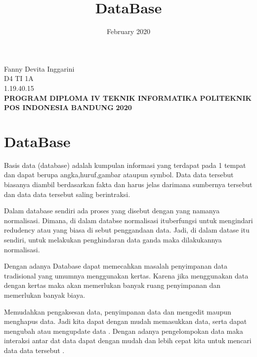 \documentclass{article}
\date{February 2020}
\begin{document}
\title{\huge\textbf{DataBase}}
\date{}

\maketitle
\begin{center}
\vspace{4cm}
Fanny Devita Inggarini\\
D4 TI 1A\\
1.19.40.15\\
\vspace{4cm}
\textbf{PROGRAM DIPLOMA IV TEKNIK INFORMATIKA} \linebreak
\textbf{POLITEKNIK POS INDONESIA} \linebreak
\textbf{BANDUNG}\linebreak
\textbf{2020}\\

\end{center}
\newpage

\section{DataBase}
\par Basis data (database) adalah kumpulan informasi yang terdapat pada 1 tempat dan dapat berupa angka,huruf,gambar ataupun symbol. Data data tersebut biasanya diambil berdasarkan fakta  dan harus jelas darimana  sumbernya tersebut dan data data tersebut  saling berintraksi.
\vspace{0,5cm}
\par Dalam database sendiri ada proses yang disebut dengan yang namanya normalisasi. Dimana, di dalam databse normalisasi ituberfungsi untuk mengindari redudency atau yang biasa di sebut penggandaan data. Jadi, di dalam datase itu sendiri, untuk melakukan penghindaran data ganda maka dilakukannya normalisasi.
\vspace{0,5cm}
\par Dengan adanya Database dapat memecahkan masalah penyimpanan data tradisional yang umumnya menggunakan kertas.  Karena jika menggunakan  data dengan kertas  maka akan memerlukan banyak ruang penyimpanan dan memerlukan banyak biaya.
\vspace{0,5cm}
\par Memudahkan pengaksesan data, penyimpanan data dan mengedit maupun menghapus data. Jadi kita dapat dengan mudah memasukkan data,  serta dapat mengubah atau mengupdate  data . Dengan adanya pengelompokan data  maka interaksi antar dat data dapat dengan mudah  dan lebih cepat kita untuk mencari data data tersebut .
\end{document}
